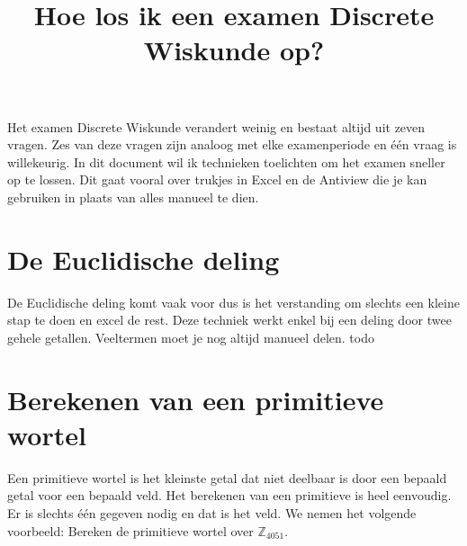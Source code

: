 \documentclass{article}
\def\warning#1{\color{red} #1 \color{black}}
\begin{document}
\title{Hoe los ik een examen Discrete Wiskunde op?}
\date{}
\author{}
\maketitle

\tableofcontents


Het examen Discrete Wiskunde verandert weinig en bestaat altijd uit zeven vragen. Zes van deze vragen zijn analoog met elke examenperiode en één vraag is willekeurig. In dit document wil ik technieken toelichten
om het examen sneller op te lossen. Dit gaat vooral over trukjes in Excel en de Antiview die je kan gebruiken in plaats van alles manueel te dien. 


\section{De Euclidische deling}
De Euclidische deling komt vaak voor dus is het verstanding om slechts een kleine stap te doen en excel de rest. Deze techniek werkt enkel bij een deling door twee gehele getallen. Veeltermen moet je nog altijd manueel delen. \warning{todo}

\section{Berekenen van een primitieve wortel}
Een primitieve wortel is het kleinste getal dat niet deelbaar is door een bepaald getal voor een bepaald veld. Het berekenen van een primitieve is heel eenvoudig. 
Er is slechts één gegeven nodig en dat is het veld. We nemen het volgende voorbeeld: Bereken de primitieve wortel over $\mathbb{Z}_{4051}.$
\end{document}
